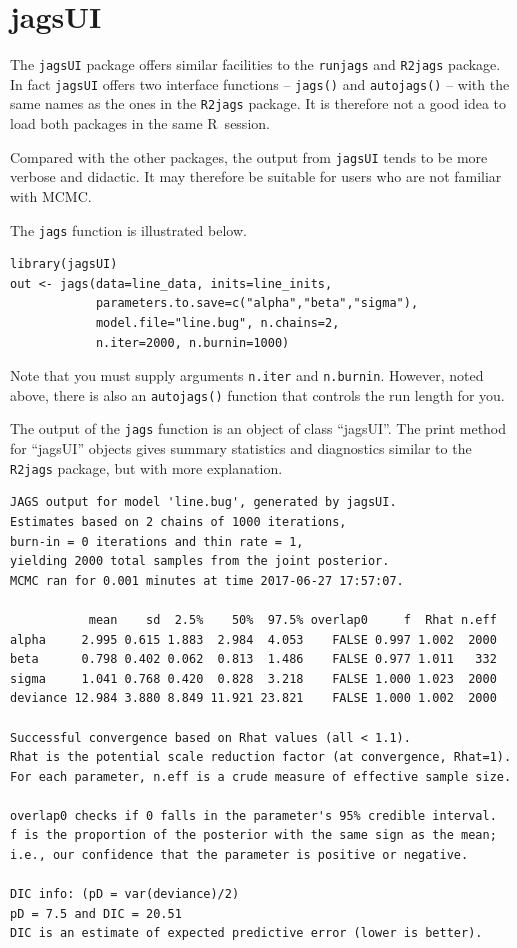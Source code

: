 \documentclass[11pt, a4paper, titlepage]{report}
\newcommand{\R}{\textsf{R}}
\begin{document}
\section{jagsUI}

The \texttt{jagsUI} package offers similar facilities to the
\texttt{runjags} and \texttt{R2jags} package. In fact \texttt{jagsUI}
offers two interface functions -- \texttt{jags()} and
\texttt{autojags()} -- with the same names as the ones in the
\texttt{R2jags} package. It is therefore not a good idea to load both
packages in the same \R\ session.

Compared with the other packages, the output from \texttt{jagsUI}
tends to be more verbose and didactic. It may therefore be suitable
for users who are not familiar with MCMC.

The \texttt{jags} function is illustrated below.
\begin{verbatim}
library(jagsUI)
out <- jags(data=line_data, inits=line_inits,
            parameters.to.save=c("alpha","beta","sigma"),
            model.file="line.bug", n.chains=2,
            n.iter=2000, n.burnin=1000)
\end{verbatim}
Note that you must supply arguments \texttt{n.iter} and
\texttt{n.burnin}. However, noted above, there is also an
\texttt{autojags()} function that controls the run length for you.

The output of the \texttt{jags} function is an object of class
``jagsUI''.  The print method for ``jagsUI'' objects gives summary
statistics and diagnostics similar to the \texttt{R2jags} package, but
with more explanation.
\begin{verbatim}
JAGS output for model 'line.bug', generated by jagsUI.
Estimates based on 2 chains of 1000 iterations,
burn-in = 0 iterations and thin rate = 1,
yielding 2000 total samples from the joint posterior. 
MCMC ran for 0.001 minutes at time 2017-06-27 17:57:07.

           mean    sd  2.5%    50%  97.5% overlap0     f  Rhat n.eff
alpha     2.995 0.615 1.883  2.984  4.053    FALSE 0.997 1.002  2000
beta      0.798 0.402 0.062  0.813  1.486    FALSE 0.977 1.011   332
sigma     1.041 0.768 0.420  0.828  3.218    FALSE 1.000 1.023  2000
deviance 12.984 3.880 8.849 11.921 23.821    FALSE 1.000 1.002  2000

Successful convergence based on Rhat values (all < 1.1). 
Rhat is the potential scale reduction factor (at convergence, Rhat=1). 
For each parameter, n.eff is a crude measure of effective sample size. 

overlap0 checks if 0 falls in the parameter's 95% credible interval.
f is the proportion of the posterior with the same sign as the mean;
i.e., our confidence that the parameter is positive or negative.

DIC info: (pD = var(deviance)/2) 
pD = 7.5 and DIC = 20.51 
DIC is an estimate of expected predictive error (lower is better).
\end{verbatim}
\end{document}
